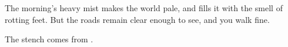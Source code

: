 \begin{boxtext}
  The morning's heavy mist makes the world pale, and fills it with the smell of rotting feet.
  But the roads remain clear enough to see, and you walk fine.
\end{boxtext}

The stench comes from .

\basilisk

